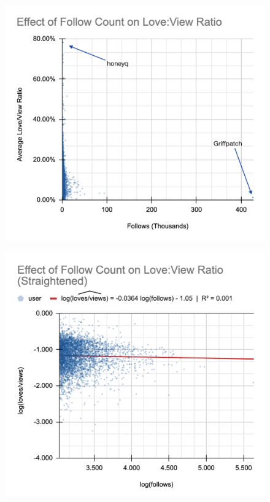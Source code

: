 \documentclass[12pt]{article}
\begin{document}
\begin{flushleft}
	\newpage
	\begin{figure}[h]
		\includegraphics[width=\linewidth]{img/plot1.png}
		\centering
	\end{figure}
	
	\newpage
	\begin{figure}[h]
		\includegraphics[width=\linewidth]{img/plot2.png}
		\centering
	\end{figure}
	

\end{flushleft}
\end{document}
